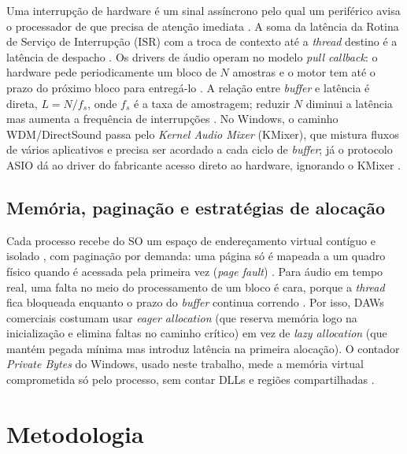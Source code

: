 \documentclass[tcc1]{classe_uftex/uftex}
\begin{document}
Uma interrupção de hardware é um sinal assíncrono pelo qual um
periférico avisa o processador de que precisa de atenção imediata
\cite{silberschatz2018}. A soma da latência da Rotina de Serviço de
Interrupção (ISR) com a troca de contexto até a \textit{thread} destino
é a latência de despacho \cite{stallings2017os}. Os drivers de áudio
operam no modelo \textit{pull callback}: o hardware pede periodicamente
um bloco de $N$ amostras e o motor tem até o prazo do próximo bloco
para entregá-lo \cite{fons2010}. A relação entre \textit{buffer} e
latência é direta, $L = N / f_s$, onde $f_s$ é a taxa de amostragem;
reduzir $N$ diminui a latência mas aumenta a frequência de interrupções
\cite{kim2003}. No Windows, o caminho WDM/DirectSound passa pelo
\textit{Kernel Audio Mixer} (KMixer), que mistura fluxos de vários
aplicativos e precisa ser acordado a cada ciclo de \textit{buffer}; já
o protocolo ASIO dá ao driver do fabricante acesso direto ao hardware,
ignorando o KMixer \cite{microsoft2023asio}.

\section{Memória, paginação e estratégias de alocação}

Cada processo recebe do SO um espaço de endereçamento virtual contíguo
e isolado \cite{silberschatz2018}, com paginação por demanda: uma
página só é mapeada a um quadro físico quando é acessada pela primeira
vez (\textit{page fault}) \cite{tanenbaum2016}. Para áudio em tempo
real, uma falta no meio do processamento de um bloco é cara, porque a
\textit{thread} fica bloqueada enquanto o prazo do \textit{buffer}
continua correndo \cite{kim2003}. Por isso, DAWs comerciais costumam
usar \textit{eager allocation} (que reserva memória logo na
inicialização e elimina faltas no caminho crítico) em vez de
\textit{lazy allocation} (que mantém pegada mínima mas introduz
latência na primeira alocação). O contador \textit{Private Bytes} do
Windows, usado neste trabalho, mede a memória virtual comprometida só
pelo processo, sem contar DLLs e regiões compartilhadas
\cite{stallings2018}.


\chapter{Metodologia}
\end{document}
